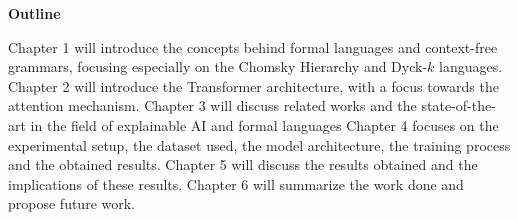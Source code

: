 \bigskip

\textbf{Outline}

Chapter 1 will introduce the concepts behind formal languages and context-free grammars, focusing especially on the Chomsky Hierarchy and Dyck-$k$ languages.
Chapter 2 will introduce the Transformer architecture, with a focus towards the attention mechanism.
Chapter 3 will discuss related works and the state-of-the-art in the field of explainable AI and formal languages
Chapter 4 focuses on the experimental setup, the dataset used, the model architecture, the training process and the obtained results.
Chapter 5 will discuss the results obtained and the implications of these results.
Chapter 6 will summarize the work done and propose future work.